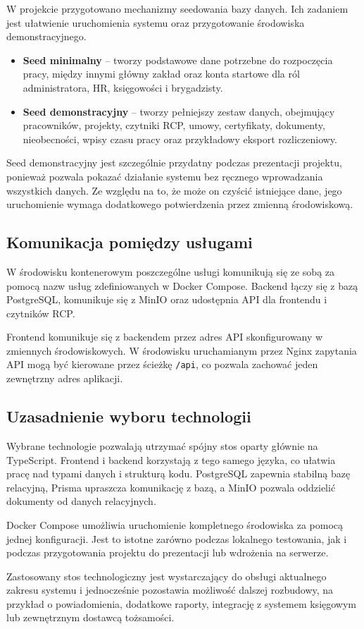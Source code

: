 W projekcie przygotowano mechanizmy seedowania bazy danych. Ich zadaniem jest ułatwienie uruchomienia systemu oraz przygotowanie środowiska demonstracyjnego.

\begin{itemize}
    \item \textbf{Seed minimalny} -- tworzy podstawowe dane potrzebne do rozpoczęcia pracy, między innymi główny zakład oraz konta startowe dla ról administratora, HR, księgowości i brygadzisty.
    \item \textbf{Seed demonstracyjny} -- tworzy pełniejszy zestaw danych, obejmujący pracowników, projekty, czytniki RCP, umowy, certyfikaty, dokumenty, nieobecności, wpisy czasu pracy oraz przykładowy eksport rozliczeniowy.
\end{itemize}

Seed demonstracyjny jest szczególnie przydatny podczas prezentacji projektu, ponieważ pozwala pokazać działanie systemu bez ręcznego wprowadzania wszystkich danych. Ze względu na to, że może on czyścić istniejące dane, jego uruchomienie wymaga dodatkowego potwierdzenia przez zmienną środowiskową.

\subsection{Komunikacja pomiędzy usługami}

W środowisku kontenerowym poszczególne usługi komunikują się ze sobą za pomocą nazw usług zdefiniowanych w Docker Compose. Backend łączy się z bazą PostgreSQL, komunikuje się z MinIO oraz udostępnia API dla frontendu i czytników RCP.

Frontend komunikuje się z backendem przez adres API skonfigurowany w zmiennych środowiskowych. W środowisku uruchamianym przez Nginx zapytania API mogą być kierowane przez ścieżkę \texttt{/api}, co pozwala zachować jeden zewnętrzny adres aplikacji.

\subsection{Uzasadnienie wyboru technologii}

Wybrane technologie pozwalają utrzymać spójny stos oparty głównie na TypeScript. Frontend i backend korzystają z tego samego języka, co ułatwia pracę nad typami danych i strukturą kodu. PostgreSQL zapewnia stabilną bazę relacyjną, Prisma upraszcza komunikację z bazą, a MinIO pozwala oddzielić dokumenty od danych relacyjnych.

Docker Compose umożliwia uruchomienie kompletnego środowiska za pomocą jednej konfiguracji. Jest to istotne zarówno podczas lokalnego testowania, jak i podczas przygotowania projektu do prezentacji lub wdrożenia na serwerze.

Zastosowany stos technologiczny jest wystarczający do obsługi aktualnego zakresu systemu i jednocześnie pozostawia możliwość dalszej rozbudowy, na przykład o powiadomienia, dodatkowe raporty, integrację z systemem księgowym lub zewnętrznym dostawcą tożsamości.